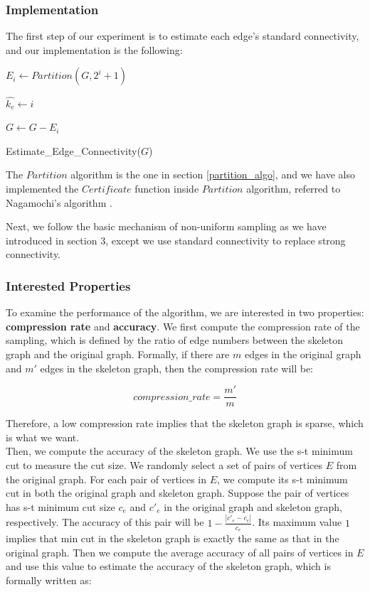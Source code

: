 \documentclass{article}
\begin{document}
\subsubsection{Implementation}
The first step of our experiment is to estimate each edge's standard connectivity, and our implementation is the following:

\begin{algorithm}[H]
\SetAlgoLined

     {
        $E_i \gets Partition(G, 2^i+1)$\;
        
         {
            $\hat{k_e} \gets i$\;
        }
    
        $G \gets G - E_i$\;
    }
        
\caption{Estimate\_Edge\_Connectivity($G$)}
\end{algorithm}

The $Partition$ algorithm is the one in section \ref{partition_algo}, and we have also implemented the $Certificate$ function inside $Partition$ algorithm, referred to Nagamochi's algorithm \cite{nagamochi1992linear}.

\bigskip

Next, we follow the basic mechanism of non-uniform sampling as we have introduced in section 3, except we use standard connectivity to replace strong connectivity. \\

\subsubsection{Interested Properties}
To examine the performance of the algorithm, we are interested in two properties: \textbf{compression rate} and \textbf{accuracy}.
We first compute the compression rate of the sampling, which is defined by the ratio of edge numbers between the skeleton graph and the original graph. Formally, if there are $m$ edges in the original graph and $m'$ edges in the skeleton graph, then the compression rate will be:

\begin{equation}
    compression\_rate = \frac{m'}{m}
\end{equation}

Therefore, a low compression rate implies that the skeleton graph is sparse, which is what we want. \\

Then, we compute the accuracy of the skeleton graph. We use the s-t minimum cut to measure the cut size.
We randomly select a set of pairs of vertices $E$ from the original graph. For each pair of vertices in $E$, we compute its s-t minimum cut in both the original graph and skeleton graph. Suppose the pair of vertices has s-t minimum cut size $c_e$ and $c'_e$ in the original graph and skeleton graph, respectively. The accuracy of this pair will be $ 1- \frac{|c'_e - c_e|}{c_e}$. Its maximum value $1$ implies that min cut in the skeleton graph is exactly the same as that in the original graph. Then we compute the average accuracy of all pairs of vertices in $E$ and use this value to estimate the accuracy of the skeleton graph, which is formally written as:
\end{document}
